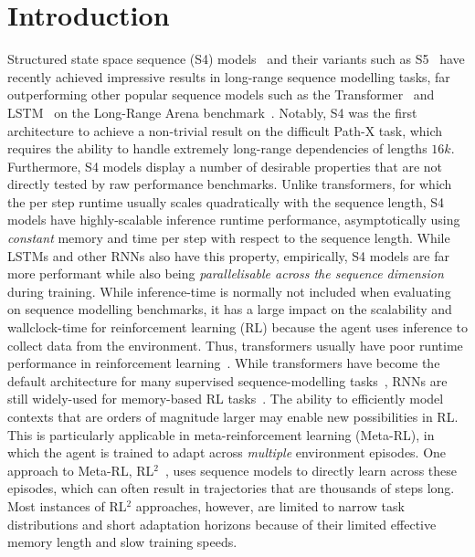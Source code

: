 \documentclass{article}
\begin{document}
\section{Introduction}
\label{sec:Introduction}
Structured state space sequence (S4) models~\citep{gu2021efficiently} and their variants such as S5~\citep{smith2022simplified} have recently achieved impressive results in long-range sequence modelling tasks, far outperforming other popular sequence models such as the Transformer~\citep{vaswani2017attention} and LSTM~\citep{hochreiter1997long} on the Long-Range Arena benchmark~\citep{tay2020long}. Notably, S4 was the first architecture to achieve a non-trivial result on the difficult Path-X task, which requires the ability to handle extremely long-range dependencies of lengths $16k$.
Furthermore, S4 models display a number of desirable properties that are not directly tested by raw performance benchmarks. Unlike transformers, for which the per step runtime usually scales quadratically with the sequence length, S4 models have highly-scalable inference runtime performance, asymptotically using \textit{constant} memory and time per step with respect to the sequence length. While LSTMs and other RNNs also have this property, empirically, S4 models are far more performant while also being \textit{parallelisable across the sequence dimension} during training.
While inference-time is normally not included when evaluating on sequence modelling benchmarks,
it has a large impact on the scalability and wallclock-time for reinforcement learning (RL) because the agent uses inference to collect data from the environment. Thus, transformers usually have poor runtime performance in reinforcement learning~\citep{parisotto2021efficient}. While transformers have become the default architecture for many supervised sequence-modelling tasks~\citep{vaswani2017attention}, RNNs are still widely-used for memory-based RL tasks~\citep{ni2022recurrent}.
The ability to efficiently model contexts that are orders of magnitude larger may enable new possibilities in RL. This is particularly applicable in meta-reinforcement learning (Meta-RL), in which the agent is trained to adapt across \textit{multiple} environment episodes. One approach to Meta-RL, RL$^2$~\citep{duan2016rl, wang2016learning}, uses sequence models to directly learn across these episodes, which can often result in trajectories that are thousands of steps long. Most instances of RL$^2$ approaches, however, are limited to narrow task distributions and short adaptation horizons because of their limited effective memory length and slow training speeds.
\end{document}
